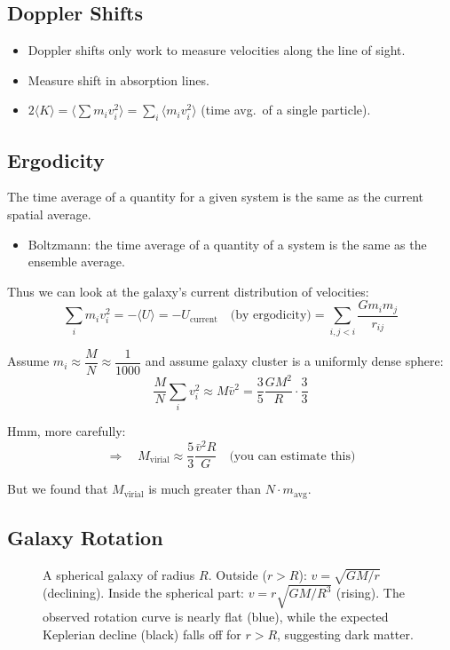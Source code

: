 \subsection{Doppler Shifts}

\begin{itemize}
    \item Doppler shifts only work to measure velocities along the line of sight.
    \item Measure shift in absorption lines.
    \item $2\langle K\rangle = \langle\sum m_i v_i^2\rangle = \sum_i \langle m_i v_i^2\rangle$ (time avg.\ of a single particle).
\end{itemize}

\subsection{Ergodicity}

\begin{definition}
The time average of a quantity for a given system is the same as the current spatial average.
\begin{itemize}
    \item Boltzmann: the time average of a quantity of a system is the same as the ensemble average.
\end{itemize}
\end{definition}

Thus we can look at the galaxy's current distribution of velocities:
\[
    \sum_i m_i v_i^2 = -\langle U\rangle = -U_\text{current} \quad\text{(by ergodicity)}
    = \sum_{i,j<i}\frac{Gm_i m_j}{r_{ij}}
\]

Assume $m_i \approx \dfrac{M}{N} \approx \dfrac{1}{1000}$ and assume galaxy cluster is a uniformly dense sphere:
\[
    \frac{M}{N}\sum_i v_i^2 \approx M\bar{v}^2 = \frac{3}{5}\frac{GM^2}{R} \cdot \frac{3}{3}
\]

Hmm, more carefully:
\[
    \Rightarrow\quad M_\text{virial} \approx \frac{5}{3}\frac{\bar{v}^2 R}{G}
    \quad \text{(you can estimate this)}
\]

But we found that $M_\text{virial}$ is much greater than $N \cdot m_\text{avg}$.

\subsection{Galaxy Rotation}

\begin{figure}[H]
\centering
\caption{A spherical galaxy of radius $R$. Outside ($r > R$): $v = \sqrt{GM/r}$ (declining). Inside the spherical part: $v = r\sqrt{GM/R^3}$ (rising). The observed rotation curve is nearly flat (blue), while the expected Keplerian decline (black) falls off for $r > R$, suggesting dark matter.}
\end{figure}

